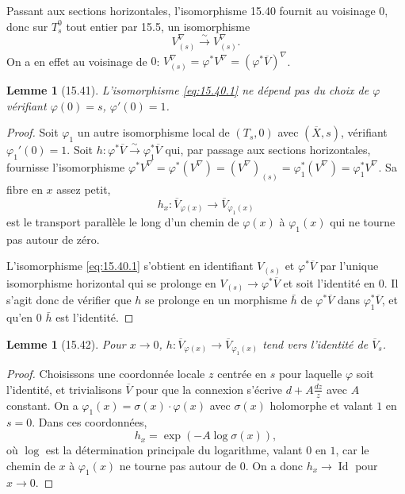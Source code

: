 \documentclass[12pt,a4paper]{article}
\theoremstyle{plain}
\newtheorem{lemma}[theorem]{Lemme}
\theoremstyle{definition}
\theoremstyle{remark}
\newcommand{\Id}{\operatorname{Id}}
\begin{document}
Passant aux sections horizontales, l'isomorphisme 15.40 fournit au voisinage $0$, donc sur $T_s^0$ tout entier par 15.5, un isomorphisme
\begin{equation}\label{eq:15.40.1}
V^\nabla_{(s)} \xrightarrow{\sim} V_{(s)}^\nabla.
\end{equation}
On a en effet au voisinage de $0$: $V^\nabla_{(s)} = \varphi^* V^\nabla = (\varphi^* \overline{V})^\nabla$.

\begin{lemma}[15.41]
L'isomorphisme \eqref{eq:15.40.1} ne dépend pas du choix de $\varphi$ vérifiant $\varphi(0) = s$, $\varphi'(0) = 1$.
\end{lemma}

\begin{proof}
Soit $\varphi_1$ un autre isomorphisme local de $(T_s, 0)$ avec $(\overline{X}, s)$, vérifiant $\varphi_1'(0) = 1$. Soit $h: \varphi^* \overline{V} \xrightarrow{\sim} \varphi_1^* \overline{V}$ qui, par passage aux sections horizontales, fournisse l'isomorphisme $\varphi^* V^\nabla = \varphi^*(V^\nabla) = (V^\nabla)_{(s)} = \varphi_1^*(V^\nabla) = \varphi_1^* V^\nabla$. Sa fibre en $x$ assez petit,
\[
h_x: \overline{V}_{\varphi(x)} \to \overline{V}_{\varphi_1(x)}
\]
est le transport parallèle le long d'un chemin de $\varphi(x)$ à $\varphi_1(x)$ qui ne tourne pas autour de zéro.

L'isomorphisme \eqref{eq:15.40.1} s'obtient en identifiant $V_{(s)}$ et $\varphi^* \overline{V}$ par l'unique isomorphisme horizontal qui se prolonge en $V_{(s)} \to \varphi^* \overline{V}$ et soit l'identité en $0$. Il s'agit donc de vérifier que $h$ se prolonge en un morphisme $\bar{h}$ de $\varphi^* \overline{V}$ dans $\varphi_1^* \overline{V}$, et qu'en $0$ $\bar{h}$ est l'identité.
\end{proof}

\begin{lemma}[15.42]
Pour $x \to 0$, $h: \overline{V}_{\varphi(x)} \to \overline{V}_{\varphi_1(x)}$ tend vers l'identité de $\overline{V}_s$.
\end{lemma}

\begin{proof}
Choisissons une coordonnée locale $z$ centrée en $s$ pour laquelle $\varphi$ soit l'identité, et trivialisons $\overline{V}$ pour que la connexion s'écrive $d + A \frac{dz}{z}$ avec $A$ constant. On a $\varphi_1(x) = \sigma(x) \cdot \varphi(x)$ avec $\sigma(x)$ holomorphe et valant $1$ en $s = 0$. Dans ces coordonnées,
\[
h_x = \exp(-A \log \sigma(x)),
\]
où $\log$ est la détermination principale du logarithme, valant $0$ en $1$, car le chemin de $x$ à $\varphi_1(x)$ ne tourne pas autour de $0$. On a donc $h_x \to \Id$ pour $x \to 0$.
\end{proof}
\end{document}
